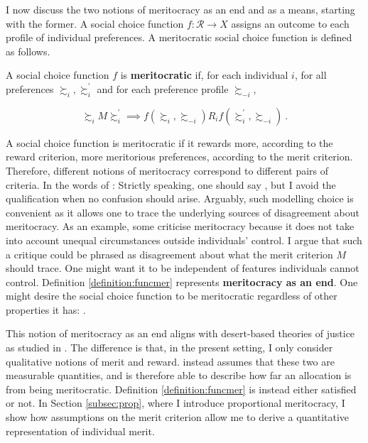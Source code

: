 I now discuss the two notions of meritocracy as an end and as a means, starting with the former. A social choice function \( f \colon \mathcal{R} \rightarrow X \) assigns an outcome to each profile of individual preferences. A meritocratic social choice function is defined as follows.

\begin{definition}\label{definition:funcmer}
	A social choice function \( f \) is \textbf{meritocratic} if, for each individual \( i \), for all preferences \( \succsim_i, \succsim_i^{\prime} \) and for each preference profile \( \succsim_{-i} \),

	\[ \succsim_i M \succsim_i^{\prime} \implies f ( \succsim_i, \succsim_{-i} ) R_i f ( \succsim_i^{\prime}, \succsim_{-i} ) \: .\]
\end{definition}

A social choice function is meritocratic if it rewards more, according to the reward criterion, more meritorious preferences, according to the merit criterion. Therefore, different notions of meritocracy correspond to different pairs of criteria. In the words of \cite{senMeritJustice2000}:  Strictly speaking, one should say , but I avoid the qualification when no confusion should arise. Arguably, such modelling choice is convenient as it allows one to trace the underlying sources of disagreement about meritocracy. As an example, some criticise meritocracy because it does not take into account unequal circumstances outside individuals' control. I argue that such a critique could be phrased as disagreement about what the merit criterion \( M \) should trace. One might want it to be independent of features individuals cannot control. Definition \ref{definition:funcmer} represents \textbf{meritocracy as an end}. One might desire the social choice function to be meritocratic regardless of other properties it has:  \citep[p. 2]{sep-meritocracy}.

This notion of meritocracy as an end aligns with desert-based theories of justice as studied in \cite{kaganGeometryDesert2014}. The difference is that, in the present setting, I only consider qualitative notions of merit and reward. \cite{kaganGeometryDesert2014} instead assumes that these two are measurable quantities, and is therefore able to describe how far an allocation is from being meritocratic. Definition \ref{definition:funcmer} is instead either satisfied or not. In Section \ref{subsec:prop}, where I introduce proportional meritocracy, I show how assumptions on the merit criterion allow me to derive a quantitative representation of individual merit.

